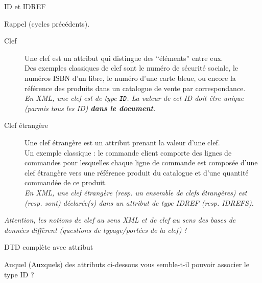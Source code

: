 \begin{frame}{ID et IDREF}

Rappel (cycles précédents).\\

\begin{description}
\item[Clef] Une clef est un attribut qui distingue des ``éléments'' entre eux. \\
Des exemples classiques de clef sont le numéro de sécurité sociale, le numéros ISBN d'un libre, le numéro d'une carte bleue, ou encore la référence des produits dans un catalogue de vente par correspondance.\\
{\it En XML, une clef est de type \verb?ID?. La valeur de cet ID doit \^etre unique (parmis tous les ID) \textbf{dans le document}.}

\item[Clef étrangère] Une clef étrangère est un attribut prenant la valeur d’une clef. \\
Un exemple classique : le commande client comporte des lignes de commandes pour lesquelles chaque ligne de commande est composée d'une clef étrangère vers une référence produit du catalogue et d'une quantité commandée de ce produit.\\
{\it En XML, une clef étrangère (resp. un ensemble de clefs étrangères) est (resp. sont) déclarée(s) dans un attribut de type IDREF (resp. IDREFS).}
\end{description}

\bigskip

{\it Attention, les notions de clef au sens XML et de clef au sens des bases de données diffèrent (questions de typage/portées de la clef) !}
\end{frame}


\begin{frame}[containsverbatim]{DTD complète avec attribut}



\begin{exoblock}
Auquel (Auxquels) des attributs ci-dessous vous semble-t-il pouvoir associer le type ID ? 
\end{exoblock}
\end{frame}

